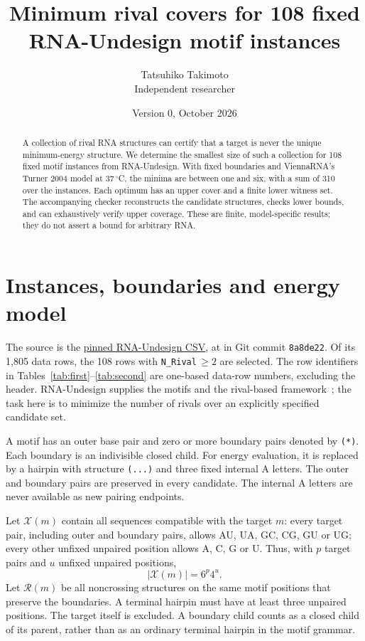 \documentclass[10pt,a4paper]{article}
\title{Minimum rival covers for 108 fixed\\RNA-Undesign motif instances}
\author{Tatsuhiko Takimoto\\\small Independent researcher}
\date{Version 0, October 2026}
\newcommand{\Rset}{\mathcal R}
\newcommand{\Xset}{\mathcal X}
\begin{document}
\maketitle
\begin{abstract}
A collection of rival RNA structures can certify that a target is never the unique minimum-energy structure. We determine the smallest size of such a collection for 108 fixed motif instances from RNA-Undesign. With fixed boundaries and ViennaRNA's Turner 2004 model at 37\,$^\circ$C, the minima are between one and six, with a sum of 310 over the instances. Each optimum has an upper cover and a finite lower witness set. The accompanying checker reconstructs the candidate structures, checks lower bounds, and can exhaustively verify upper coverage. These are finite, model-specific results; they do not assert a bound for arbitrary RNA.
\end{abstract}
\section{Instances, boundaries and energy model}
The source is the \href{https://raw.githubusercontent.com/shanry/RNA-Undesign/8a8de22/data/motifs_maxlen14_no_external/results.uniq.csv}{pinned RNA-Undesign CSV}, at  in Git commit \texttt{8a8de22}. Of its 1,805 data rows, the 108 rows with \texttt{N\_Rival}\,$\ge2$ are selected. The row identifiers in Tables~\ref{tab:first}--\ref{tab:second} are one-based data-row numbers, excluding the header. RNA-Undesign supplies the motifs and the rival-based framework~\cite{rigende,fastmotif}; the task here is to minimize the number of rivals over an explicitly specified candidate set.

A motif has an outer base pair and zero or more boundary pairs denoted by \texttt{(*)}. Each boundary is an indivisible closed child. For energy evaluation, it is replaced by a hairpin with structure \texttt{(...)} and three fixed internal A letters. The outer and boundary pairs are preserved in every candidate. The internal A letters are never available as new pairing endpoints.

Let $\Xset(m)$ contain all sequences compatible with the target $m$: every target pair, including outer and boundary pairs, allows AU, UA, GC, CG, GU or UG; every other unfixed unpaired position allows A, C, G or U. Thus, with $p$ target pairs and $u$ unfixed unpaired positions,
\[
 |\Xset(m)|=6^p4^u.
\]
Let $\Rset(m)$ be all noncrossing structures on the same motif positions that preserve the boundaries. A terminal hairpin must have at least three unpaired positions. The target itself is excluded. A boundary child counts as a closed child of its parent, rather than as an ordinary terminal hairpin in the motif grammar.
\end{document}
